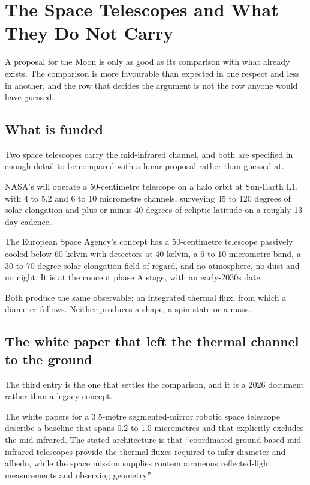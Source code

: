 
\chapter{The Space Telescopes and What They Do Not Carry}
\label{ch:space-telescopes}

A proposal for the Moon is only as good as its comparison with what already
exists. The comparison is more favourable than expected in one respect and
less in another, and the row that decides the argument is not the row anyone
would have guessed.

\section{What is funded}

Two space telescopes carry the mid-infrared channel, and both are specified
in enough detail to be compared with a lunar proposal rather than guessed
at.

NASA's  will operate a 50-centimetre telescope on a halo orbit at
Sun-Earth L1, with 4 to 5.2 and 6 to 10 micrometre channels, surveying 45
to 120 degrees of solar elongation and plus or minus 40 degrees of ecliptic
latitude on a roughly 13-day cadence.

The European Space Agency's  concept has a 50-centimetre telescope
passively cooled below 60 kelvin with detectors at 40 kelvin, a 6 to 10
micrometre band, a 30 to 70 degree solar elongation field of regard, and no
atmosphere, no dust and no night. It is at the concept phase A stage, with
an early-2030s date.

Both produce the same observable: an integrated thermal flux, from which a
diameter follows. Neither produces a shape, a spin state or a mass.

\section{The white paper that left the thermal channel to the ground}

The third entry is the one that settles the comparison, and it is a 2026
document rather than a legacy concept.

The white papers for a 3.5-metre segmented-mirror robotic space telescope
describe a baseline that spans 0.2 to 1.5 micrometres and that explicitly
excludes the mid-infrared. The stated architecture is that ``coordinated
ground-based mid-infrared telescopes provide the thermal fluxes required to
infer diameter and albedo, while the space mission supplies contemporaneous
reflected-light measurements and observing geometry''.

